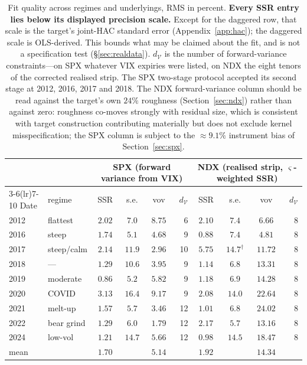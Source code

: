 \documentclass[11pt]{article}
\providecommand{\1}{\mathbf 1}
\begin{document}
\begin{table}[htbp]
\centering
{\small
\begin{tabular}{llcccrcccr}
\toprule
& & \multicolumn{4}{c}{SPX (forward variance from VIX)} & \multicolumn{4}{c}{NDX (realised strip, $\varsigma$-weighted SSR)} \\
\cmidrule(lr){3-6}\cmidrule(lr){7-10}
Date & regime & SSR & s.e. & vov & $d_{\mathcal V}$ & SSR & s.e. & vov & $d_{\mathcal V}$ \\
\midrule
2012 & flattest    & $2.02$ & $7.0$  & $8.75$ & 6  & $2.10$ & $7.4$  & $6.66$  & 8 \\
2016 & steep       & $1.74$ & $5.1$  & $4.68$ & 9  & $0.88$ & $7.4$  & $4.81$  & 8 \\
2017 & steep/calm  & $2.14$ & $11.9$ & $2.96$ & 10 & $5.75$ & $14.7^{\dagger}$ & $11.72$ & 8 \\
2018 & ---         & $1.29$ & $10.6$ & $3.95$ & 9  & $1.14$ & $6.8$  & $13.31$ & 8 \\
2019 & moderate    & $0.86$ & $5.2$  & $5.82$ & 9  & $1.18$ & $6.9$  & $14.28$ & 8 \\
2020 & COVID       & $3.13$ & $16.4$ & $9.17$ & 9  & $2.08$ & $14.0$ & $22.64$ & 8 \\
2021 & melt-up     & $1.57$ & $5.7$  & $3.46$ & 12 & $1.01$ & $6.8$  & $24.02$ & 8 \\
2022 & bear grind  & $1.29$ & $6.0$  & $1.79$ & 12 & $2.17$ & $5.7$  & $13.16$ & 8 \\
2024 & low-vol     & $1.21$ & $14.7$ & $5.66$ & 12 & $0.98$ & $14.5$ & $18.47$ & 8 \\
\midrule
\multicolumn{2}{l}{mean} & $\mathbf{1.70}$ & & $5.14$ & & $\mathbf{1.92}$ & & $14.34$ & \\
\bottomrule
\end{tabular}}
\caption{Fit quality across regimes and underlyings, RMS in percent. \textbf{Every SSR entry lies
below its displayed precision scale.} Except for the daggered row, that scale is the target's
joint-HAC standard error (Appendix~\ref{app:hac}); the daggered scale is OLS-derived. This bounds
what may be claimed about the fit, and is not a specification test (\S\ref{sec:realdata}). $d_{\mathcal V}$ is the number of forward-variance
constraints---on SPX whatever VIX expiries were listed, on NDX the eight tenors of the corrected
realised strip. The SPX two-stage protocol accepted its second stage at 2012, 2016, 2017 and 2018.
The NDX forward-variance column should be read against the target's own $24\%$ roughness
(Section~\ref{sec:ndx}) rather than against zero: roughness co-moves strongly with residual size,
which is consistent with target construction contributing materially but does not exclude kernel
misspecification; the SPX column is
subject to the ${\approx}9.1\%$ instrument bias of Section~\ref{sec:spx}.}
\label{tab:crossregime}
\end{table}
\end{document}
